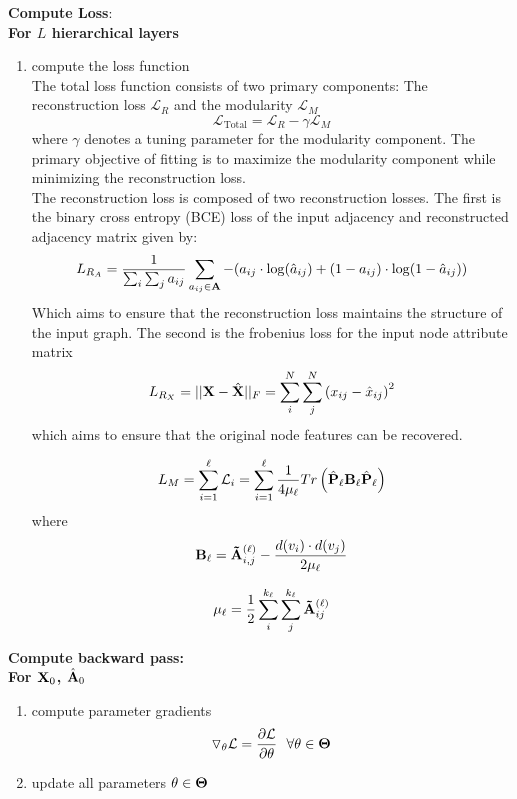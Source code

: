 \documentclass[a4paper,12pt]{article}
\begin{document}
\begin{itemize}
\begin{enumerate}
{\begin{enumerate}
			\end{enumerate}
			
			
			\item[2.2.2]{\textbf{Compute Loss}: \\
				\textbf{For $L$ hierarchical layers}
			\begin{enumerate}
				\item[]{compute the loss function \\
					
					The total loss function consists of two primary components: The reconstruction loss $\mathcal{L}_R$ and the modularity $\mathcal{L}_M$
					\[\mathcal{L}_{\text{Total}} = \mathcal{L}_R - \gamma\mathcal{L}_M \]
					where $\gamma$ denotes a tuning parameter for the modularity component. The primary objective of fitting is to maximize the modularity component while minimizing the reconstruction loss. \\
					
					The reconstruction loss is composed of two reconstruction losses. The first is the binary cross entropy (BCE) loss of the input adjacency and reconstructed adjacency matrix given by: 
					\[L_{R_A} = \frac{1}{\sum_i\sum_j a_{ij}} \sum_{a_{ij}\in {\bf A}} -(a_{ij} \cdot\log(\hat{a}_{ij})+(1 - a_{ij})\cdot\log(1 - \hat{a}_{ij})) \]
					Which aims to ensure that the reconstruction loss maintains the structure of the input graph. The second is the frobenius loss for the input node attribute matrix 
					\[L_{R_X} = ||{\bf X} - \hat{\bf X}||_F = \sum_i^N \sum_j^N \left(x_{ij} - \hat{x}_{ij}\right)^2 \]
					which aims to ensure that the original node features can be recovered. 
					
					\[L_M = \sum_{i = 1}^{\ell} \mathcal{L}_i =  \sum_{i=1}^\ell \frac{1}{4\mu_\ell}Tr\left(\hat{\bf P}_\ell {\bf B_\ell} \hat{\bf P}_\ell\right)\]
					where\\
					\[{\bf B_\ell} = {\bf \tilde A}^{(\ell)}_{i,j} - \frac{d(v_i)\cdot d(v_j)}{2\mu_\ell}\]
					
					\[\mu_\ell = \frac{1}{2}\sum_i^{k_\ell} \sum_j^{k_\ell} {\bf \tilde A}^{(\ell)}_{ij}\]
					}
			\end{enumerate}
			}
			\item[2.2.3]{\textbf{Compute backward pass:}} \\
			\textbf{For ${\bf X}_0$, $\hat{\bf A}_0$ } 
			\begin{enumerate}
				\item[]{compute parameter gradients 
					\[\triangledown_\theta \mathcal{L} =  \frac{\partial\mathcal{L}}{\partial {\bf \theta}} \ \ \forall \theta \in {\bf \Theta}\]}
				
				\item[]{update all parameters $\theta \in {\bf \Theta}$}  
			\end{enumerate}
			
		}
		\end{enumerate} 
	
	\end{itemize}
	
\end{document}
